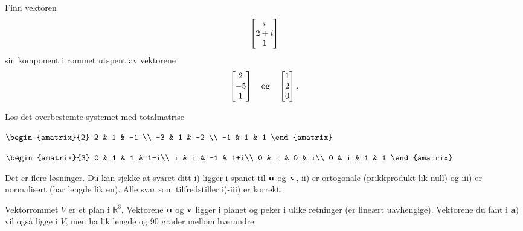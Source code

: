 \begin{oppgave}
Finn vektoren 
\[
\begin{bmatrix} i \\ 2+i \\ 1 \end{bmatrix}
\]
sin komponent i rommet utspent av vektorene 
\[
\begin{bmatrix} 2 \\ -5 \\ 1 \end{bmatrix}\quad  \text{og} \quad \begin{bmatrix} 1 \\ 2 \\ 0 \end{bmatrix}.
\]
\end{oppgave}

\begin{oppgave}
Løs det overbestemte systemet med totalmatrise\\[2pt]
\begin{punkt}
$
\begin{amatrix}{2}
2 & 1 & -1 \\
-3 & 1 & -2 \\
 -1 & 1  & 1
\end{amatrix}\\[4pt]
$
\end{punkt}
\begin{punkt}
$
\begin{amatrix}{3}
0 & 1 & 1  & 1-i\\
i & i & -1 & 1+i\\
 0 & i  & 0 & i\\
  0 & i  & 1 & 1
\end{amatrix}\\[4pt]
$
\end{punkt}

\end{oppgave}

\begin{losning}

\begin{punkt}
Det er flere løsninger. Du kan sjekke at svaret ditt i) ligger i spanet til $\mathbf{u}$ og~$\mathbf{v}$, ii) er ortogonale (prikkprodukt lik null) og iii) er normalisert (har lengde lik en). Alle svar som tilfredstiller i)-iii) er korrekt.
\end{punkt}
\begin{punkt}
Vektorrommet $V$ er et plan i $\mathbb{R}^3$. Vektorene $\mathbf{u}$ og $\mathbf{v}$ ligger i planet og peker i ulike retninger (er lineært uavhengige). Vektorene du fant i $\textbf{a)}$ vil også ligge i $V$, men ha lik lengde og 90 grader mellom hverandre.
\end{punkt}

\end{losning}

\begin{losning}
\end{losning}

%

